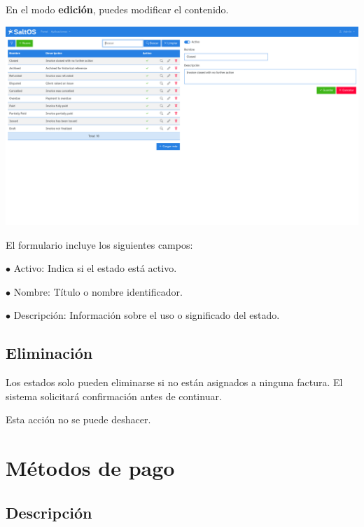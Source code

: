 \documentclass[a4paper]{article}
\begin{document}
En el modo \textbf{edición}, puedes modificar el contenido.

\begin{center}\includegraphics[width=1\textwidth]{../ujest/snaps/test-screenshots-js-screenshots-sales-invoices-status-edit-10-es-es-1-snap.png}\end{center}

El formulario incluye los siguientes campos:

\begin{compactitem}
\item[\color{myblue}$\bullet$] Activo: Indica si el estado está activo.
\item[\color{myblue}$\bullet$] Nombre: Título o nombre identificador.
\item[\color{myblue}$\bullet$] Descripción: Información sobre el uso o significado del estado.
\end{compactitem}

\hypertarget{toc145}{}
\subsection{Eliminación}

Los estados solo pueden eliminarse si no están asignados a ninguna factura.
El sistema solicitará confirmación antes de continuar.

Esta acción no se puede deshacer.


\hypertarget{toc146}{}
\section{Métodos de pago}

\hypertarget{toc147}{}
\subsection{Descripción}
\end{document}
